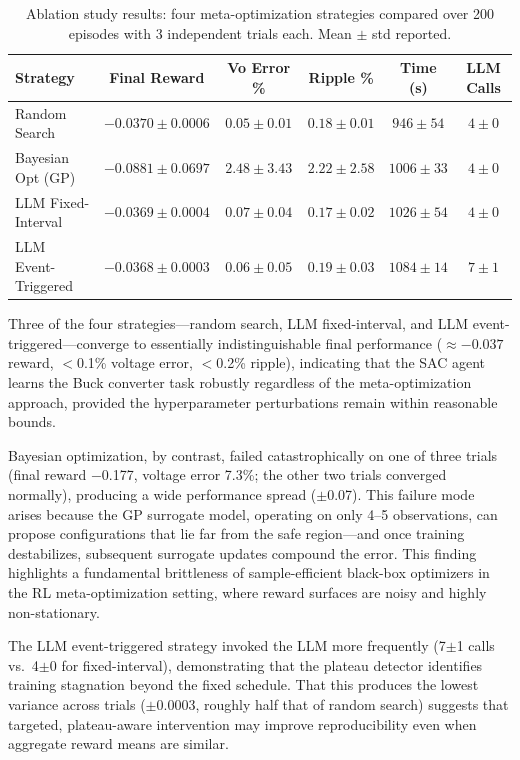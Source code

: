 \documentclass[11pt,a4paper]{article}
\begin{document}
\begin{table}[H]
\centering
\caption{Ablation study results: four meta-optimization strategies compared over 200 episodes
with 3 independent trials each. Mean $\pm$ std reported.}
\label{tab:ablation}
\begin{tabular}{lccccc}
\toprule
\textbf{Strategy} & \textbf{Final Reward} & \textbf{Vo Error \%} & \textbf{Ripple \%} & \textbf{Time (s)} & \textbf{LLM Calls} \\
\midrule
Random Search      & $-0.0370 \pm 0.0006$ & $0.05 \pm 0.01$ & $0.18 \pm 0.01$ & $946 \pm 54$ & $4 \pm 0$ \\
Bayesian Opt (GP)  & $-0.0881 \pm 0.0697$ & $2.48 \pm 3.43$ & $2.22 \pm 2.58$ & $1006 \pm 33$ & $4 \pm 0$ \\
LLM Fixed-Interval & $-0.0369 \pm 0.0004$ & $0.07 \pm 0.04$ & $0.17 \pm 0.02$ & $1026 \pm 54$ & $4 \pm 0$ \\
LLM Event-Triggered& $-0.0368 \pm 0.0003$ & $0.06 \pm 0.05$ & $0.19 \pm 0.03$ & $1084 \pm 14$ & $7 \pm 1$ \\
\bottomrule
\end{tabular}
\end{table}

Three of the four strategies---random search, LLM fixed-interval, and LLM
event-triggered---converge to essentially indistinguishable final performance
($\approx$$-0.037$ reward, $<$0.1\% voltage error, $<$0.2\% ripple), indicating
that the SAC agent learns the Buck converter task robustly regardless of the
meta-optimization approach, provided the hyperparameter perturbations remain
within reasonable bounds.

Bayesian optimization, by contrast, failed catastrophically on one of three
trials (final reward $-$0.177, voltage error 7.3\%; the other two trials
converged normally), producing a wide performance spread ($\pm$0.07).
This failure mode arises because the GP surrogate model, operating on only
4--5 observations, can propose configurations that lie far from the safe
region---and once training destabilizes, subsequent surrogate updates
compound the error. This finding highlights a fundamental brittleness of
sample-efficient black-box optimizers in the RL meta-optimization setting,
where reward surfaces are noisy and highly non-stationary.

The LLM event-triggered strategy invoked the LLM more frequently (7$\pm$1 calls
vs.\ 4$\pm$0 for fixed-interval), demonstrating that the plateau detector
identifies training stagnation beyond the fixed schedule. That this produces
the lowest variance across trials ($\pm$0.0003, roughly half that of random
search) suggests that targeted, plateau-aware intervention may improve
reproducibility even when aggregate reward means are similar.
\end{document}
